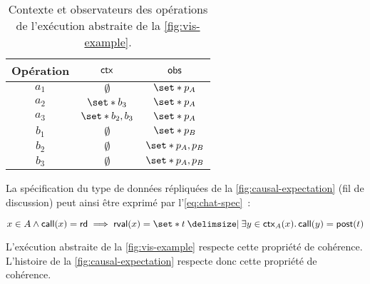 \begin{table}[htb]
    \centering
    \begin{tabular}{ccc}
        Opération & $\operatorname{\mathsf{ctx}}$ & $\operatorname{\mathsf{obs}}$ \\
        \toprule
        $a_1$ & $\emptyset$ & $\set*{p_A}$ \\
        $a_2$ & $\set*{b_3}$ & $\set*{p_A}$ \\
        $a_3$ & $\set*{b_2, b_3}$ & $\set*{p_A}$ \\
        $b_1$ & $\emptyset$ & $\set*{p_B}$ \\
        $b_2$ & $\emptyset$ & $\set*{p_A, p_B}$ \\
        $b_3$ & $\emptyset$ & $\set*{p_A, p_B}$ \\
    \end{tabular}
    \caption{Contexte et observateurs des opérations de l'exécution abstraite de la \autoref{fig:vis-example}.}\label{tab:op-ctx-obs}
\end{table}

La spécification du type de données répliquées de la \autoref{fig:causal-expectation} (fil de discussion) peut ainsi être exprimé par l'\autoref{eq:chat-spec}~:

\begin{equation}\label{eq:chat-spec}
    x \in A \land \trm{call}(x) = \trm{rd} \implies \trm{rval}(x) = \set*{t \given \exists y \in \trm{ctx}_A(x) \qsep \trm{call}(y) = \trm{post}(t)}
\end{equation}

L'exécution abstraite de la \autoref{fig:vis-example} respecte cette propriété de cohérence.
L'histoire de la \autoref{fig:causal-expectation} respecte donc cette propriété de cohérence.



